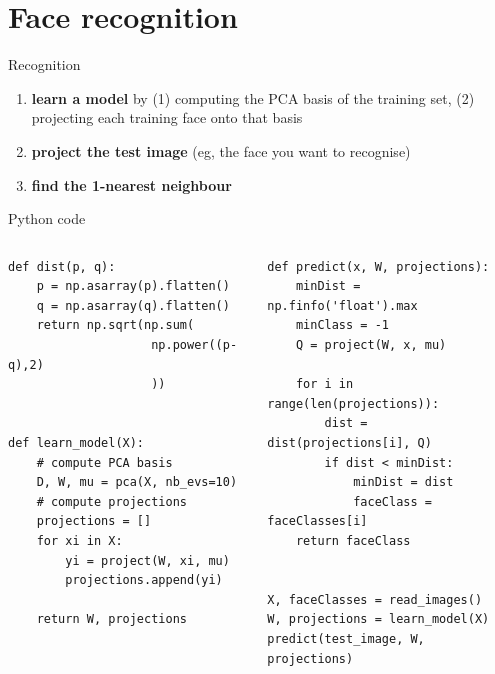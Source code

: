 \documentclass[compress]{beamer}
\begin{document}
\section[Face recognition]{Face recognition}



\begin{frame}{Recognition}

    \begin{enumerate}
        \item \textbf{learn a model} by (1) computing the PCA basis of the
            training set, (2) projecting each training face onto that basis
        \item \textbf{project the test image} (eg, the face you want to
            recognise)
        \item \textbf{find the 1-nearest neighbour}
    \end{enumerate}
\end{frame}

\begin{frame}[fragile]{Python code}


    \begin{columns}
        \begin{column}{0.5\linewidth}
\begin{verbatim}
def dist(p, q):
    p = np.asarray(p).flatten()
    q = np.asarray(q).flatten()
    return np.sqrt(np.sum(
                    np.power((p-q),2)
                    ))


def learn_model(X):
    # compute PCA basis
    D, W, mu = pca(X, nb_evs=10)
    # compute projections
    projections = []
    for xi in X:
        yi = project(W, xi, mu)
        projections.append(yi)

    return W, projections
\end{verbatim}

        \end{column}
        \begin{column}{0.5\linewidth}


\begin{verbatim}
def predict(x, W, projections):
    minDist = np.finfo('float').max
    minClass = -1
    Q = project(W, x, mu)

    for i in range(len(projections)):
        dist = dist(projections[i], Q)
        if dist < minDist:
            minDist = dist
            faceClass = faceClasses[i]
    return faceClass


X, faceClasses = read_images()
W, projections = learn_model(X)
predict(test_image, W, projections)

\end{verbatim}
        \end{column}
    \end{columns}

\end{frame}
\end{document}
